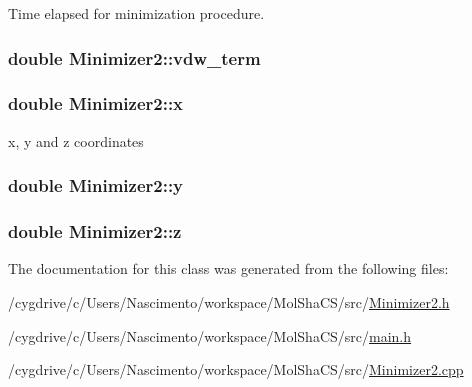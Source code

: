 Time elapsed for minimization procedure. 

\hypertarget{classMinimizer2_a056a439a64220298d298cd7e2bd59339}{
\subsubsection[{vdw\_\-term}]{\setlength{\rightskip}{0pt plus 5cm}double {\bf Minimizer2::vdw\_\-term}}}
\label{classMinimizer2_a056a439a64220298d298cd7e2bd59339}
\hypertarget{classMinimizer2_ad34cff3ae59c83548e2d5485e800897e}{
\subsubsection[{x}]{\setlength{\rightskip}{0pt plus 5cm}double {\bf Minimizer2::x}}}
\label{classMinimizer2_ad34cff3ae59c83548e2d5485e800897e}


x, y and z coordinates 

\hypertarget{classMinimizer2_a894a781f062079e7fb78ec9ee176f197}{
\subsubsection[{y}]{\setlength{\rightskip}{0pt plus 5cm}double {\bf Minimizer2::y}}}
\label{classMinimizer2_a894a781f062079e7fb78ec9ee176f197}
\hypertarget{classMinimizer2_a67af59755e277209aff3e4137364be63}{
\subsubsection[{z}]{\setlength{\rightskip}{0pt plus 5cm}double {\bf Minimizer2::z}}}
\label{classMinimizer2_a67af59755e277209aff3e4137364be63}


The documentation for this class was generated from the following files:\begin{DoxyCompactItemize}
\item 
/cygdrive/c/Users/Nascimento/workspace/MolShaCS/src/\hyperlink{Minimizer2_8h}{Minimizer2.h}\item 
/cygdrive/c/Users/Nascimento/workspace/MolShaCS/src/\hyperlink{main_8h}{main.h}\item 
/cygdrive/c/Users/Nascimento/workspace/MolShaCS/src/\hyperlink{Minimizer2_8cpp}{Minimizer2.cpp}\end{DoxyCompactItemize}
